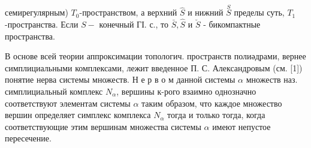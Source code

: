 \documentclass[10pt]{article}
\begin{document}
семирегулярным) $T_{0}$-пространством, а верхний $\hat{S}$ и нижний $\stackrel{S}{S}$ пределы суть, $T_{1}$-пространства. Если $S-$ конечный ГІ. с., то $\bar{S}, \hat{S}$ и $\breve{S}$ - бикомпактные пространства.



В основе всей теории аппроксимации топологич. пространств полиәдрами, вернее симплициальными комплексами, лежит введенное П. С. Александровым (см. [1]) понятие нерва системы множеств. Н е р в о м данной системы $\alpha$ множеств наз. симплициальный комплекс $N_{\alpha}$, вершины к-рого взаимно однозначно соответствуют элементам системы $\alpha$ таким образом, что каждое множество вершин определяет симплекс комплекса $N_{\alpha}$ тогда и только тогда, когда соответствующие этим вершинам множества системы $\alpha$ имеют непустое пересечение.
\end{document}
